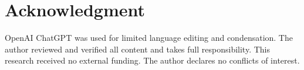 \section*{Acknowledgment}

OpenAI ChatGPT was used for limited language editing and condensation. The author reviewed and verified all content and takes full responsibility. This research received no external funding. The author declares no conflicts of interest.
